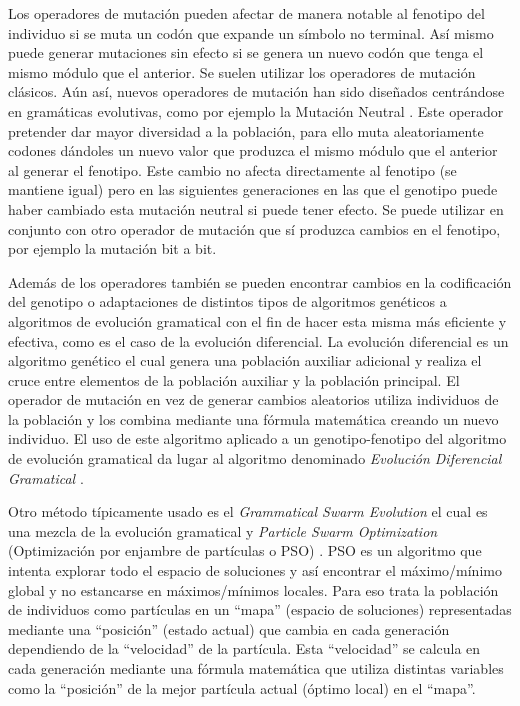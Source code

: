Los operadores de mutación pueden afectar de manera notable al fenotipo del individuo si se muta un codón que expande un símbolo no terminal. Así mismo puede generar mutaciones sin efecto si se genera un nuevo codón que tenga el mismo módulo que el anterior. Se suelen utilizar los operadores de mutación clásicos. Aún así, nuevos operadores de mutación han sido diseñados centrándose en gramáticas evolutivas, como por ejemplo la Mutación Neutral \cite{Oesch2015}. Este operador pretender dar mayor diversidad a la población, para ello muta aleatoriamente codones dándoles un nuevo valor que produzca el mismo módulo que el anterior al generar el fenotipo. Este cambio no afecta directamente al fenotipo (se mantiene igual) pero en las siguientes generaciones en las que el genotipo puede haber cambiado esta mutación neutral si puede tener efecto. Se puede utilizar en conjunto con otro operador de mutación que sí produzca cambios en el fenotipo, por ejemplo la mutación bit a bit.

Además de los operadores también se pueden encontrar cambios en la codificación del genotipo \cite{lourencco2016unveiling} o adaptaciones de distintos tipos de algoritmos genéticos a algoritmos de evolución gramatical con el fin de hacer esta misma más eficiente y efectiva, como es el caso de la evolución diferencial. La evolución diferencial es un algoritmo genético el cual genera una población auxiliar adicional y realiza el cruce entre elementos de la población auxiliar y la población principal. El operador de mutación en vez de generar cambios aleatorios utiliza individuos de la población y los combina mediante una fórmula matemática creando un nuevo individuo. El uso de este algoritmo aplicado a un genotipo-fenotipo del algoritmo de evolución gramatical da lugar al algoritmo denominado \textit{Evolución Diferencial Gramatical} \cite{o2006grammatical}.

Otro método típicamente usado es el \textit{Grammatical Swarm Evolution} el cual es una mezcla de la evolución gramatical y \textit{Particle Swarm Optimization} (Optimización por enjambre de partículas o PSO) \cite{o2004grammatical} \cite{gomez2010particle}. PSO es un algoritmo que intenta explorar todo el espacio de soluciones y así encontrar el máximo/mínimo global y no estancarse en máximos/mínimos locales. Para eso trata la población de individuos como partículas en un ``mapa'' (espacio de soluciones) representadas mediante una ``posición'' (estado actual) que cambia en cada generación dependiendo de la ``velocidad''  de la partícula. Esta ``velocidad'' se calcula en cada generación mediante una fórmula matemática que utiliza distintas variables como la ``posición'' de la mejor partícula actual (óptimo local) en el ``mapa''.

